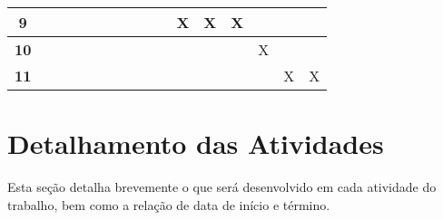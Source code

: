 \begin{table}[H]
\begin{tabular}{c|c|c|c|c|c|c|c|c|c|c|c|c|c|c|c|}
\multicolumn{1}{|c|}{{\bf 9}}         &         &         &               &         &         &         &         &         &         & X        & X       & X       &         &         &         \\ \hline
\multicolumn{1}{|c|}{{\bf 10}}        &         &         &               &         &         &         &         &         &         &          &         &         & X       &         &         \\ \hline
\multicolumn{1}{|c|}{{\bf 11}}        &         &         &               &         &         &         &         &         &         &          &         &         &         & X       & X       \\ \hline
\end{tabular}
\end{table}

\section{Detalhamento das Atividades}
Esta seção detalha brevemente o que será desenvolvido em cada atividade do
trabalho, bem como a relação de data de início e término.

